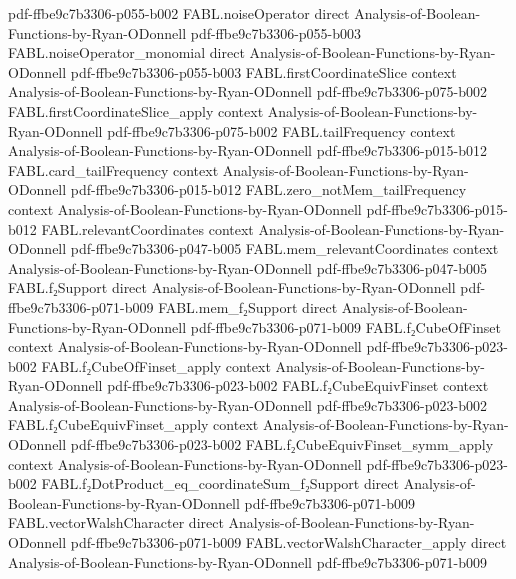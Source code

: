 \begin{theorem}
  {pdf-ffbe9c7b3306-p055-b002}
\proofstep
  {FABL.noiseOperator}
  {direct}
  {Analysis-of-Boolean-Functions-by-Ryan-ODonnell}
  {pdf-ffbe9c7b3306-p055-b003}
\proofstep
  {FABL.noiseOperator_monomial}
  {direct}
  {Analysis-of-Boolean-Functions-by-Ryan-ODonnell}
  {pdf-ffbe9c7b3306-p055-b003}
\proofstep
  {FABL.firstCoordinateSlice}
  {context}
  {Analysis-of-Boolean-Functions-by-Ryan-ODonnell}
  {pdf-ffbe9c7b3306-p075-b002}
\proofstep
  {FABL.firstCoordinateSlice_apply}
  {context}
  {Analysis-of-Boolean-Functions-by-Ryan-ODonnell}
  {pdf-ffbe9c7b3306-p075-b002}
\proofstep
  {FABL.tailFrequency}
  {context}
  {Analysis-of-Boolean-Functions-by-Ryan-ODonnell}
  {pdf-ffbe9c7b3306-p015-b012}
\proofstep
  {FABL.card_tailFrequency}
  {context}
  {Analysis-of-Boolean-Functions-by-Ryan-ODonnell}
  {pdf-ffbe9c7b3306-p015-b012}
\proofstep
  {FABL.zero_notMem_tailFrequency}
  {context}
  {Analysis-of-Boolean-Functions-by-Ryan-ODonnell}
  {pdf-ffbe9c7b3306-p015-b012}
\proofstep
  {FABL.relevantCoordinates}
  {context}
  {Analysis-of-Boolean-Functions-by-Ryan-ODonnell}
  {pdf-ffbe9c7b3306-p047-b005}
\proofstep
  {FABL.mem_relevantCoordinates}
  {context}
  {Analysis-of-Boolean-Functions-by-Ryan-ODonnell}
  {pdf-ffbe9c7b3306-p047-b005}
\proofstep
  {FABL.f₂Support}
  {direct}
  {Analysis-of-Boolean-Functions-by-Ryan-ODonnell}
  {pdf-ffbe9c7b3306-p071-b009}
\proofstep
  {FABL.mem_f₂Support}
  {direct}
  {Analysis-of-Boolean-Functions-by-Ryan-ODonnell}
  {pdf-ffbe9c7b3306-p071-b009}
\proofstep
  {FABL.f₂CubeOfFinset}
  {context}
  {Analysis-of-Boolean-Functions-by-Ryan-ODonnell}
  {pdf-ffbe9c7b3306-p023-b002}
\proofstep
  {FABL.f₂CubeOfFinset_apply}
  {context}
  {Analysis-of-Boolean-Functions-by-Ryan-ODonnell}
  {pdf-ffbe9c7b3306-p023-b002}
\proofstep
  {FABL.f₂CubeEquivFinset}
  {context}
  {Analysis-of-Boolean-Functions-by-Ryan-ODonnell}
  {pdf-ffbe9c7b3306-p023-b002}
\proofstep
  {FABL.f₂CubeEquivFinset_apply}
  {context}
  {Analysis-of-Boolean-Functions-by-Ryan-ODonnell}
  {pdf-ffbe9c7b3306-p023-b002}
\proofstep
  {FABL.f₂CubeEquivFinset_symm_apply}
  {context}
  {Analysis-of-Boolean-Functions-by-Ryan-ODonnell}
  {pdf-ffbe9c7b3306-p023-b002}
\proofstep
  {FABL.f₂DotProduct_eq_coordinateSum_f₂Support}
  {direct}
  {Analysis-of-Boolean-Functions-by-Ryan-ODonnell}
  {pdf-ffbe9c7b3306-p071-b009}
\proofstep
  {FABL.vectorWalshCharacter}
  {direct}
  {Analysis-of-Boolean-Functions-by-Ryan-ODonnell}
  {pdf-ffbe9c7b3306-p071-b009}
\proofstep
  {FABL.vectorWalshCharacter_apply}
  {direct}
  {Analysis-of-Boolean-Functions-by-Ryan-ODonnell}
  {pdf-ffbe9c7b3306-p071-b009}
\proofstep

\end{theorem}
